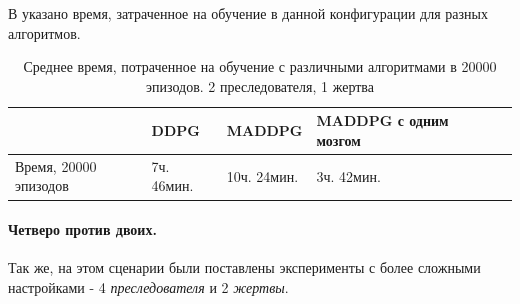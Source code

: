 В  указано время, затраченное на обучение в данной конфигурации для разных алгоритмов.

\begin{table}[t!]
    \centering\small
    \caption{Среднее время, потраченное на обучение с различными алгоритмами в 20000 эпизодов. 2 преследователя, 1 жертва}
    \label{tab-st-time}
    \begin{tabular}{|l|l|l|l|l|l|}
        \hline
        & DDPG       & MADDPG      & MADDPG с одним мозгом \\
        \hline
        Время, 20000 эпизодов & 7ч. 46мин. & 10ч. 24мин. & 3ч. 42мин.            \\ \hline
    \end{tabular}
    \normalsize%
\end{table}

\paragraph{Четверо против двоих.}

Так же, на этом сценарии были поставлены эксперименты с более сложными настройками - 4 \textit{преследователя} и 2 \textit{жертвы}.

